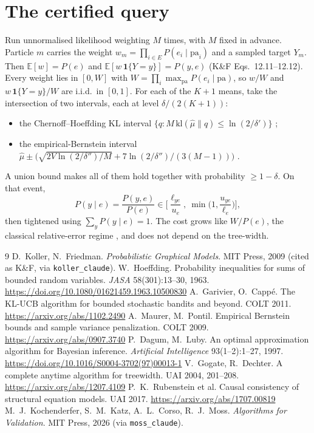 \documentclass[10pt,a4paper]{article}
\newcommand{\code}[1]{\texttt{#1}}
\begin{document}
\section{The certified query}
Run unnormalised likelihood weighting $M$ times, with $M$ fixed in advance. Particle $m$ carries
the weight $w_m=\prod_{i\in E} P(e_i\mid \mathrm{pa}_i)$ and a sampled target $Y_m$. Then
$\mathbb E[w]=P(e)$ and $\mathbb E[w\,\mathbf 1\{Y=y\}]=P(y,e)$ (K\&F Eqs.\ 12.11--12.12). Every
weight lies in $[0,W]$ with $W=\prod_i \max_{\mathrm{pa}} P(e_i\mid\mathrm{pa})$, so $w/W$ and
$w\,\mathbf 1\{Y=y\}/W$ are i.i.d.\ in $[0,1]$. For each of the $K+1$ means, take the
intersection of two intervals, each at level $\delta/(2(K+1))$:
\begin{itemize}
  \item the Chernoff--Hoeffding KL interval $\{q: M\,\mathrm{kl}(\hat\mu\|q)\leq\ln(2/\delta')\}$
  \cite{hoeffding,garivier};
  \item the empirical-Bernstein interval $\hat\mu\pm\big(\sqrt{2V\ln(2/\delta'')/M}+7\ln(2/\delta'')/(3(M-1))\big)$
  \cite{maurer}.
\end{itemize}
A union bound makes all of them hold together with probability $\geq1-\delta$. On that event,
\[ P(y\mid e)=\frac{P(y,e)}{P(e)}\in\Big[\frac{\ell_{ye}}{u_e},\ \min\Big(1,\frac{u_{ye}}{\ell_e}\Big)\Big], \]
then tightened using $\sum_y P(y\mid e)=1$. The cost grows like $W/P(e)$, the classical
relative-error regime \cite{dagum}, and does not depend on the tree-width.

\begin{thebibliography}{9}\small
{} D.~Koller, N.~Friedman. \emph{Probabilistic Graphical Models}. MIT Press, 2009 (cited as K\&F, via \code{koller\_claude}).
 W.~Hoeffding. Probability inequalities for sums of bounded random variables. \emph{JASA} 58(301):13--30, 1963. \url{https://doi.org/10.1080/01621459.1963.10500830}
 A.~Garivier, O.~Cappé. The KL-UCB algorithm for bounded stochastic bandits and beyond. COLT 2011. \url{https://arxiv.org/abs/1102.2490}
 A.~Maurer, M.~Pontil. Empirical Bernstein bounds and sample variance penalization. COLT 2009. \url{https://arxiv.org/abs/0907.3740}
 P.~Dagum, M.~Luby. An optimal approximation algorithm for Bayesian inference. \emph{Artificial Intelligence} 93(1--2):1--27, 1997. \url{https://doi.org/10.1016/S0004-3702(97)00013-1}
 V.~Gogate, R.~Dechter. A complete anytime algorithm for treewidth. UAI 2004, 201--208. \url{https://arxiv.org/abs/1207.4109}
 P.~K.~Rubenstein et al. Causal consistency of structural equation models. UAI 2017. \url{https://arxiv.org/abs/1707.00819}
 M.~J.~Kochenderfer, S.~M.~Katz, A.~L.~Corso, R.~J.~Moss. \emph{Algorithms for Validation}. MIT Press, 2026 (via \code{moss\_claude}).
\end{thebibliography}
\end{document}
